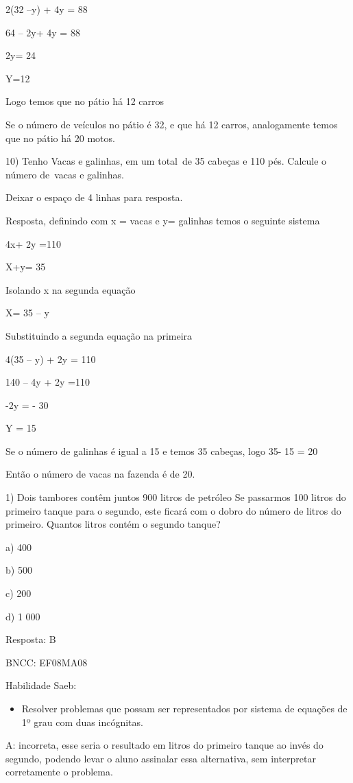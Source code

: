 {2(32 --y) + 4y = 88

64 -- 2y+ 4y = 88

2y= 24

Y=12

Logo temos que no pátio há 12 carros

Se o número de veículos no pátio é 32, e que há 12 carros, analogamente
temos que no pátio há 20 motos.

10) Tenho Vacas e galinhas, em um total~de 35 cabeças e 110 pés. Calcule
o número de~vacas e galinhas.

Deixar o espaço de 4 linhas para resposta.

Resposta, definindo com x = vacas e y= galinhas temos o seguinte sistema

4x+ 2y =110

X+y= 35

Isolando x na segunda equação

X= 35 -- y

Substituindo a segunda equação na primeira

4(35 -- y) + 2y = 110

140 -- 4y + 2y =110

-2y = - 30

Y = 15

Se o número de galinhas é igual a 15 e temos 35 cabeças, logo 35- 15 =
20

Então o número de vacas na fazenda é de 20.


1) Dois tambores contêm juntos 900 litros de petróleo Se passarmos 100
litros do primeiro tanque para o segundo, este ficará com o dobro do
número de litros do primeiro. Quantos litros contém o segundo tanque?

a) 400

b) 500

c) 200

d) 1 000

Resposta: B

BNCC: EF08MA08

Habilidade Saeb:

\begin{itemize}
\tightlist
\item
  Resolver problemas que possam ser representados por sistema de
  equações de 1º grau com duas incógnitas.
\end{itemize}

A: incorreta, esse seria o resultado em litros do primeiro tanque ao
invés do segundo, podendo levar o aluno assinalar essa alternativa, sem
interpretar corretamente o problema.

}
